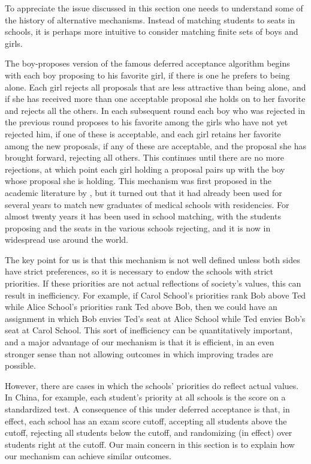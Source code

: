 \documentclass[12pt]{article}
\theoremstyle{definition}
\begin{document}
To appreciate the issue discussed in this section one needs to
understand some of the history of alternative mechanisms.  Instead of
matching students to seats in schools, it is perhaps more intuitive to
consider matching finite sets of boys and girls.

The boy-proposes version of the famous deferred acceptance algorithm
begins with each boy proposing to his favorite girl, if there is one
he prefers to being alone.  Each girl rejects all proposals that are
less attractive than being alone, and if she has received more than
one acceptable proposal she holds on to her favorite and rejects all
the others.  In each subsequent round each boy who was rejected in the
previous round proposes to his favorite among the girls who have not
yet rejected him, if one of these is acceptable, and each girl retains
her favorite among the new proposals, if any of these are acceptable,
and the proposal she has brought forward, rejecting all others.  This
continues until there are no more rejections, at which point each girl
holding a proposal pairs up with the boy whose proposal she is
holding. This mechanism was first proposed in the academic literature
by \cite{GaSh62}, but it turned out that it had already been used for
several years to match new graduates of medical schools with
residencies.  For almost twenty years it has been used in school
matching, with the students proposing and the seats in the various
schools rejecting, and it is now in widespread use around the world.

The key point for us is that this mechanism is not well defined unless
both sides have strict preferences, so it is necessary to endow the
schools with strict priorities.  If these priorities are not actual
reflections of society's values, this can result in inefficiency.  For
example, if Carol School's priorities rank Bob above Ted while Alice
School's priorities rank Ted above Bob, then we could have an
assignment in which Bob envies Ted's seat at Alice School while Ted
envies Bob's seat at Carol School.  This sort of inefficiency can be
quantitatively important, and a major advantage of our mechanism is
that it is efficient, in an even stronger sense than not allowing
outcomes in which improving trades are possible.

However, there are cases in which the schools' priorities do reflect
actual values.  In China, for example, each student's priority at all
schools is the score on a standardized test.  A consequence of this
under deferred acceptance is that, in effect, each school has an exam
score cutoff, accepting all students above the cutoff, rejecting all
students below the cutoff, and randomizing (in effect) over students
right at the cutoff.  Our main concern in this section is to explain
how our mechanism can achieve similar outcomes.
\end{document}
